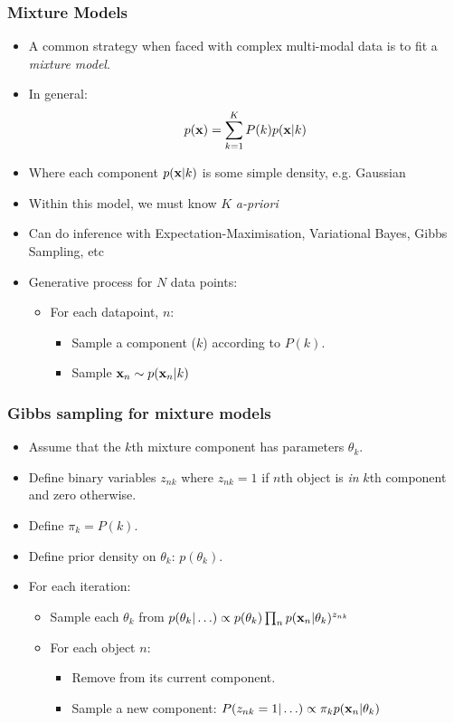 

\begin{frame}
	\frametitle{Mixture Models}
	\begin{itemize}
		\item A common strategy when faced with complex multi-modal data is to fit a \emph{mixture model}.
		\item In general:
		\[
			p(\mathbf{x}) = \sum_{k=1}^K P(k)p(\mathbf{x}|k)
		\]
		\item Where each component $p(\mathbf{x}|k)$ is some simple density, e.g. Gaussian
		\item Within this model, we must know $K$ \emph{a-priori}
		\item Can do inference with Expectation-Maximisation, Variational Bayes, Gibbs Sampling, etc
		\item Generative process for $N$ data points:
		\begin{itemize}
			\item For each datapoint, $n$:
			\begin{itemize}
				\item Sample a component ($k$) according to $P(k)$.
				\item Sample $\mathbf{x}_n\sim p(\mathbf{x}_n|k)$
			\end{itemize}
		\end{itemize}
	\end{itemize}
\end{frame}

\begin{frame}
	\frametitle{Gibbs sampling for mixture models}
	\begin{itemize}
		\item Assume that the $k$th mixture component has parameters $\theta_k$.
		\item Define binary variables $z_{nk}$ where $z_{nk}=1$ if $n$th object is \emph{in} $k$th component and zero otherwise.
		\item Define $\pi_k = P(k)$.
		\item Define prior density on $\theta_k$: $p(\theta_k)$.
		\item For each iteration:
		\begin{itemize}
			\item Sample each $\theta_k$ from $p(\theta_k|\ldots) \propto p(\theta_k)\prod_n p(\mathbf{x}_n|\theta_k)^{z_{nk}}$\\
			\item For each object $n$:
			\begin{itemize}
				\item Remove from its current component.
				\item Sample a new component: $P(z_{nk}=1|\ldots)\propto \pi_k p(\mathbf{x}_n|\theta_k)$
			\end{itemize}
		\end{itemize}
	\end{itemize}
\end{frame}

